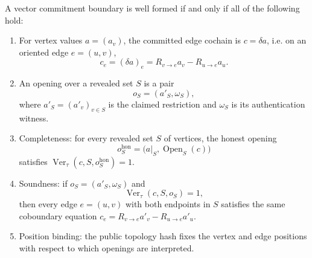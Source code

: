 \begin{definition}\label{def:vector-commitment-boundary}
  A vector commitment boundary is well formed if and only if all of the
  following hold:
  \begin{enumerate}[label=(\roman*)]
    \item For vertex values \(a=(a_v)\), the committed edge cochain is
      \(c=\delta a\), i.e. on an oriented edge \(e=(u,v)\),
      \[
        c_e=(\delta a)_e=R_{v\to e}a_v-R_{u\to e}a_u .
      \]
    \item An opening over a revealed set \(S\) is a pair
      \[
        o_S=(a'_S,\omega_S),
      \]
      where \(a'_S=(a'_v)_{v\in S}\) is the claimed restriction and
      \(\omega_S\) is its authentication witness.
    \item Completeness: for every revealed set \(S\) of vertices, the honest
      opening
      \[
        o_S^{\mathrm{hon}}
        =\bigl(a|_S,\operatorname{Open}_S(c)\bigr)
      \]
      satisfies \(\operatorname{Ver}_\tau(c,S,o_S^{\mathrm{hon}})=1\).
    \item Soundness: if \(o_S=(a'_S,\omega_S)\) and
      \[
        \operatorname{Ver}_\tau(c,S,o_S)=1,
      \]
      then every edge \(e=(u,v)\) with both endpoints in \(S\) satisfies
      the same coboundary equation
      \(c_e=R_{v\to e}a'_v-R_{u\to e}a'_u\).
    \item Position binding: the public topology hash fixes the vertex and edge
      positions with respect to which openings are interpreted.
  \end{enumerate}
\end{definition}

